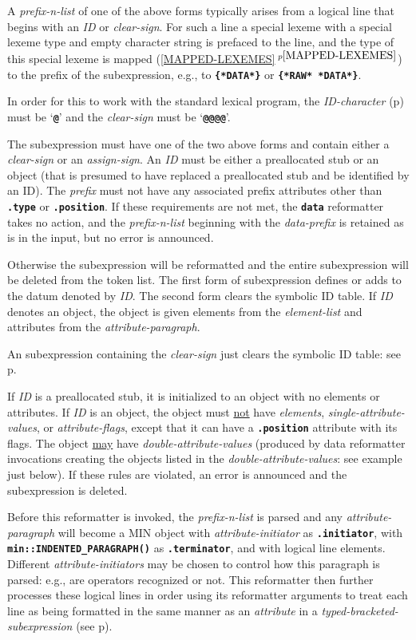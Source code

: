 \documentclass[12pt]{article}
\newcommand{\TT}[1]{{\tt \bfseries #1}}
\newcommand{\itemref}[1]{\ref{#1}$\,^{p\pageref{#1}}$}
\newcommand{\pagref}[1]{p\pageref{#1}}
\newcommand{\EOL}{\penalty \exhyphenpenalty}
\newenvironment{indpar}[1][0.3in]%
	{\begin{list}{}%
		     {\setlength{\itemsep}{0in}%
		      \setlength{\topsep}{0in}%
		      \setlength{\parsep}{1ex}%
		      \setlength{\labelwidth}{#1}%
		      \setlength{\leftmargin}{#1}%
		      \addtolength{\leftmargin}{\labelsep}}%
	 \item}%
	{\end{list}}
\begin{document}
\begin{indpar}
\begin{indpar}[0.5em]
A {\em prefix-n-list} of one of the above forms
typically arises from a logical line
that begins with an {\em ID} or {\em clear-sign}.
For such a line a special lexeme with a special
lexeme type and empty character string is prefaced
to the line, and the type of this special lexeme
is mapped (\itemref{MAPPED-LEXEMES}) to the prefix of the
subexpression, e.g., to \TT{\{*DATA*\}} or \TT{\{*RAW* *DATA*\}}.

In order for this to work with the standard lexical program,
the {\em ID-character} (\pagref{ID-CHARACTER})
must be `\TT{@}' and the {\em clear-sign} must be `\TT{@@@@}'.

The subexpression must have one of the two above forms and
contain either a {\em clear-sign} or an {\em assign-sign}.
An {\em ID} must be either
a preallocated stub or an object (that is presumed to have replaced
a preallocated stub and be identified by an ID).
The {\em prefix} must not have any associated prefix attributes other than
\TT{.type} or \TT{.position}.  If these requirements are not met, the
\TT{data} reformatter takes no action, and the {\em prefix-n-list}
beginning with the {\em data-prefix}
is retained as is in the input, but no error is announced.

Otherwise the subexpression will be reformatted and
the entire subexpression will be deleted from the token list.
The first form of subexpression defines or adds to the datum
denoted by {\em ID}.  The second form clears the symbolic ID table.
If {\em ID} denotes
an object, the object is given
elements from the {\em element-list} and attributes from the
{\em attribute-paragraph}.

An subexpression containing the {\em clear-sign} just clears the symbolic
ID table: see \pagref{CLEAR-SYMBOLIC-TABLE}.

If {\em ID} is a preallocated stub, it is initialized to
an object with no elements or attributes.  If {\em ID}
is an object, the object must \underline{not} have
{\em elements}, {\em single-attribute-values}, or
{\em attribute-flags}, except that it can have a
\TT{.position} attribute with its flags.  The object \underline{may} have
{\em double-attribute-values} (produced by data reformatter
invocations creating the objects listed in the
{\em double-attribute-values}: see example just below).
If these rules are violated, an error is announced and the
subexpression is deleted.

Before this reformatter is invoked, the {\em prefix-n-list} is parsed
and any {\em attribute-paragraph} will become a MIN object with
{\em attribute-initiator} as \TT{.ini\-tiator}, with
\TT{min::\EOL IN\-DENT\-ED\_\EOL PARAGRAPH()} as \TT{.ter\-min\-ator},
and with logical line elements.  Different
{\em attribute-initiators} may be chosen to control how this
paragraph is parsed: e.g., are operators recognized or not.
This reformatter
then further processes these logical lines in order
using its reformatter arguments to treat each line as being
formatted in the same manner as an {\em attribute}
in a {\em typed-bracketed-subexpression}
(see \pagref{TYPED-BRACKETED-SUBEXPRESSION}).


\end{indpar}
\end{indpar}
\end{document}
